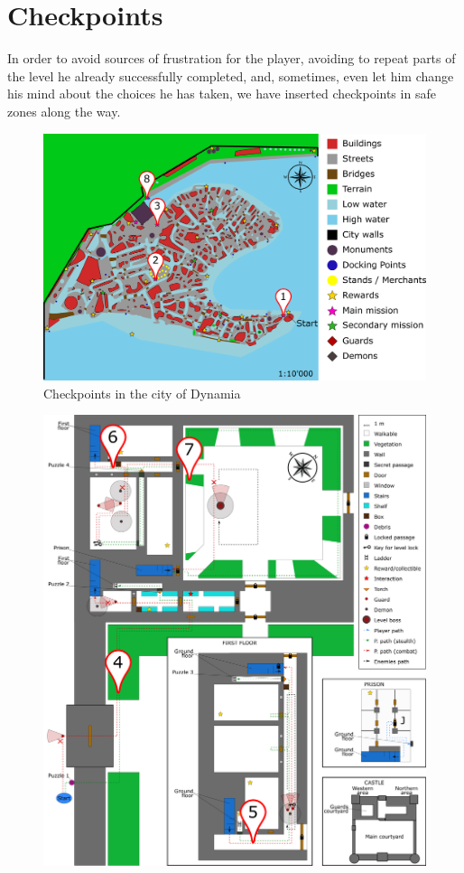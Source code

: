 \section{Checkpoints}
In order to avoid sources of frustration for the player, avoiding to repeat parts of the level he already successfully completed, and, sometimes, even let him change his mind about the choices he has taken, we have inserted checkpoints in safe zones along the way.
\begin{center}
  \begin{figure}[H]
    \centering
    \includegraphics[scale=0.47]{Images/Maps/dynamiaCheckpoints}
    \caption{Checkpoints in the city of Dynamia}
  \end{figure}
    \begin{figure}[H]
    \centering
    \includegraphics[scale=0.2]{Images/Maps/castleOfDynamiaCheckpoints}

\end{figure}
\end{center}
